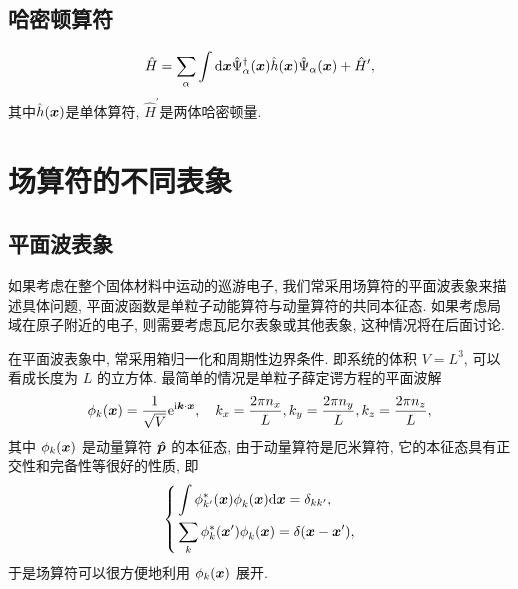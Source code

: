 \subsection{哈密顿算符}
\begin{equation}
   \hat H=\sum_\alpha\int\mathrm d\boldsymbol{x}\hat\Psi_\alpha^\dagger(\boldsymbol{x})  \hat h (\boldsymbol{x}) \hat\Psi_\alpha(\boldsymbol{x})+\hat{H}^{\prime}, 
\end{equation}
其中$\hat h (\boldsymbol{x})$是单体算符, $\hat{H}^{\prime}$是两体哈密顿量. 

\section{ 场算符的不同表象}
\subsection{平面波表象}

如果考虑在整个固体材料中运动的巡游电子, 我们常采用场算符的平面波表象来描述具体问题, 平面波函数是单粒子动能算符与动量算符的共同本征态. 如果考虑局域在原子附近的电子, 则需要考虑瓦尼尔表象或其他表象, 这种情况将在后面讨论. 

在平面波表象中, 常采用箱归一化和周期性边界条件. 即系统的体积 $V=L^3$, 可以看成长度为 $L$ 的立方体. 最简单的情况是单粒子薛定谔方程的平面波解
\begin{equation}
   \phi_{{k}}(\boldsymbol{x})=\frac{1}{\sqrt V}\mathrm e^{\mathrm i\boldsymbol{k}\cdot\boldsymbol{x}}, \quad k_x=\frac{2\pi n_x}{L}, k_y=\frac{2\pi n_y}{L}, k_z=\frac{2\pi n_z}{L}, 
\end{equation}
其中 $\phi_{{k}}(\boldsymbol{x})$ 是动量算符 $\boldsymbol{\hat p}$ 的本征态, 由于动量算符是厄米算符, 它的本征态具有正交性和完备性等很好的性质, 即
\begin{equation}
   \left\{
\begin{aligned}
&\int\phi_{ k'}^*(\boldsymbol{x})\phi_{ k}^{ }(\boldsymbol{x})\mathrm d\boldsymbol{x} =\delta_{ k k'}, \\
&\sum_{k}\phi_{k}^*(\boldsymbol{x}')\phi_{ k}^{}(\boldsymbol{x})=\delta(\boldsymbol{x}-\boldsymbol{x}'), 
\end{aligned}
\right. 
\end{equation}
于是场算符可以很方便地利用 $\phi_{ k}(\boldsymbol{x})$ 展开. 

